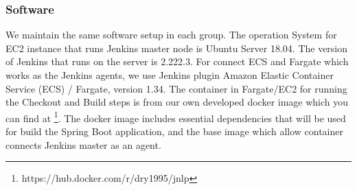 \subsubsection{Software}
We maintain the same software setup in each group. The operation System for EC2 instance that runs Jenkins master node is Ubuntu Server 18.04. The version of Jenkins that runs on the server is 2.222.3. For connect ECS and Fargate which works as the Jenkins agents, we use Jenkins plugin Amazon Elastic Container Service (ECS) / Fargate, version 1.34. The container in Fargate/EC2 for running the Checkout and Build steps is from our own developed docker image which you can find at \footnote{https://hub.docker.com/r/dry1995/jnlp}. The docker image includes essential dependencies that will be used for build the Spring Boot application, and the base image which allow container connects Jenkins master as an agent. 

